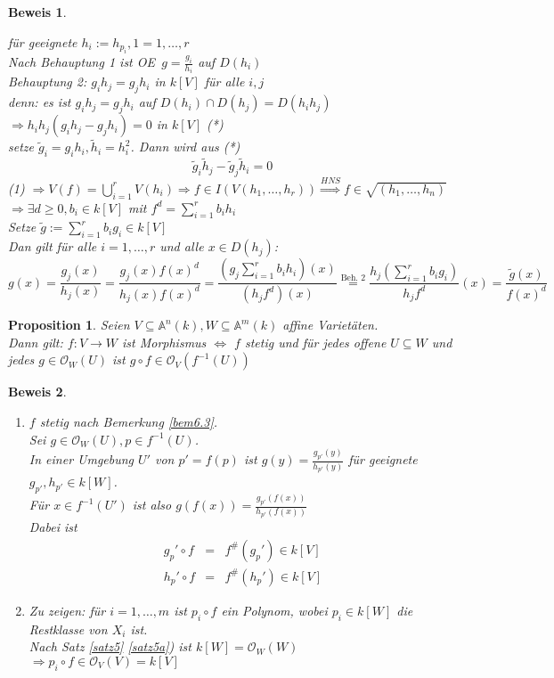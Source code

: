 \documentclass[a4paper,12pt]{report}
\theoremstyle{break}
\newtheorem{Prop}[Def]{Proposition}
\theoremstyle{nonumberbreak}
\newtheorem{Bew}{Beweis}
\theoremstyle{nonumberplain}
\newcommand{\quot}[1]{\textrm{\glqq}{#1}\textrm{\grqq}}
\newenvironment{twosidedproof}{\begin{enumerate}[\quot{$\Rightarrow$}:]}{\end{enumerate}}
\newcommand{\proofforward}{\item[\quot{$\Rightarrow$}:]}
\newcommand{\proofreverse}{\item[\quot{$\Leftarrow$}:]}
\newcommand{\A}{\mathbb{A}}
\renewcommand{\OE}{O\!\!E~}
\begin{document}
\begin{Bew}
\begin{enumerate}[a)]
\begin{description}
	f\"ur geeignete $h_i:=h_{p_i}, 1= 1,\dots ,r$\\
	Nach Behauptung 1 ist \OE $ g= \frac{g_i}{h_i}$ auf $D(h_i)$\\
	\emph{Behauptung 2:} $g_i h_j = g_j h_i$ in $k[V]$ f\"ur alle $i,j$\\
	\emph{denn:} es ist $g_ih_j = g_jh_i$ auf $D(h_i)\cap D(h_j)=D(h_ih_j)$\\
	$\Rightarrow h_ih_j(g_ih_j-g_jh_i)=0$ in $k[V]$ (*)\\
	setze $\tilde g_i = g_ih_i, \tilde h_i = h_i^2$. Dann wird aus (*)
		\[\tilde g_i \tilde h_j -\tilde g_j \tilde h_i =0\]
	(1) $\Rightarrow V(f) =\bigcup_{i=1}^r V(h_i) \Rightarrow f \in I(V(h_1,\dots ,h_r)) \stackrel{HNS}{\Rightarrow } f\in \sqrt{(h_1,\dots ,h_n)}$\\
	$\Rightarrow \exists d\geq 0, b_i\in k[V]$ mit $f^d=\sum_{i=1}^rb_ih_i$\\
	Setze $\tilde g := \sum_{i=1}^rb_ig_i\in k[V]$\\
	Dan gilt f\"ur alle $i=1,\dots ,r$ und alle $x\in D(h_j)$:
		\[g(x)=\frac{g_j(x)}{h_j(x)}=\frac{g_j(x)f(x)^d}{h_j(x)f(x)^d}=\frac{(g_j\sum_{i=1}^rb_ih_i)(x)}{(h_jf^d)(x)} \stackrel{\textrm{Beh. 2}}{=} \frac{h_j(\sum_{i=1}^rb_ig_i)}{h_jf^d}(x) = \frac{\tilde g(x)}{f(x)^d}\]
\end{description}
\end{enumerate}\end{Bew}

\begin{Prop}
Seien $V\subseteq\A^n(k), W\subseteq \A^m(k)$ affine Variet\"aten.\\
Dann gilt: $f:V\to W$ ist Morphismus $\Leftrightarrow$ $f$ stetig und f\"ur jedes offene $U\subseteq W$ und jedes $g\in \mathcal O_W(U)$ ist $g\circ f\in \mathcal O_V(f^{-1}(U))$
\end{Prop}

\begin{Bew}\begin{twosidedproof}
\proofforward
$f$ stetig nach Bemerkung \ref{bem6.3}.\\
Sei $g\in \mathcal O_W(U), p \in f^{-1}(U)$.\\
In einer Umgebung $U'$ von $p'=f(p)$ ist $g(y)=\frac{g_{p'}(y)}{h_{p'}(y)}$ f\"ur geeignete $g_{p'}, h_{p'}\in k[W]$.\\
F\"ur $x\in f^{-1}(U')$ ist also $g(f(x))=\frac{g_{p'}(f(x))}{h_{p'}(f(x))}$\\
Dabei ist\[\begin{array}{lcr}
	g_p'\circ f & = & f^{\#}(g_p')\in k[V]\\
	h_p'\circ f & = & f^{\#}(h_p')\in k[V]\end{array}\]

\proofreverse
Zu zeigen: f\"ur $i=1,\dots ,m$ ist $p_i\circ f$ ein Polynom, wobei $p_i\in k[W]$ die Restklasse von $X_i$ ist.\\
Nach Satz \ref{satz5} \ref{satz5a}) ist $k[W] = \mathcal O_W(W)$\\
$\Rightarrow p_i\circ f\in \mathcal O_V(V)=k[V]$
\end{twosidedproof}\end{Bew}
\end{document}
